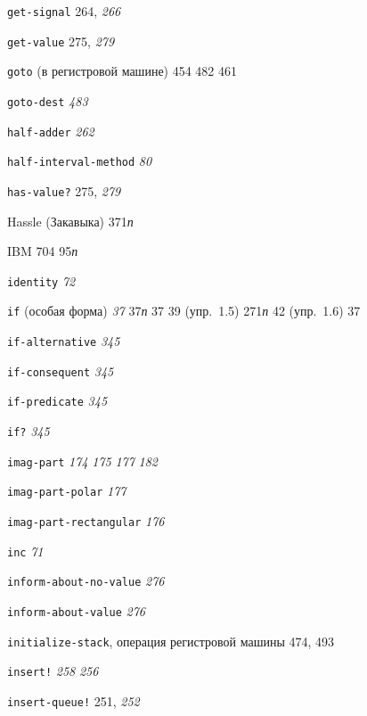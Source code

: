 \begin{theindex}
\item {\texttt{get-signal}} 264, {\it 266}
\item {\texttt{get-value}} 275, {\it 279}
\item {\texttt{goto} (в регистровой машине)} 454
   482
   461
\item {\texttt{goto-dest}} {\it 483}
\bigskip
\item {\texttt{half-adder}} {\it 262}
\item {\texttt{half-interval-method}} {\it 80}
\item {\texttt{has-value?}} 275, {\it 279}
\item {Hassle (Закавыка)} 371{\it п}
\bigskip
\item {IBM 704} 95{\it п}
\item {\texttt{identity}} {\it 72}
\item {\texttt{if} (особая форма)} {\it 37}
   37{\it п}
   37
   39 (упр.~1.5)
   271{\it п}
   42 (упр.~1.6)
   37
\item {\texttt{if-alternative}} {\it 345}
\item {\texttt{if-consequent}} {\it 345}
\item {\texttt{if-predicate}} {\it 345}
\item {\texttt{if?}} {\it 345}
\item {\texttt{imag-part}}
   {\it 174}
   {\it 175}
   {\it 177}
   {\it 182}
\item {\texttt{imag-part-polar}} {\it 177}
\item {\texttt{imag-part-rectangular}} {\it 176}
\item {\texttt{inc}} {\it 71}
\item {\texttt{inform-about-no-value}} {\it 276}
\item {\texttt{inform-about-value}} {\it 276}
\item {\texttt{initialize-stack}, операция регистровой машины} 474, 493
\item {\texttt{insert!}}
   {\it 258}
   {\it 256}
\item {\texttt{insert-queue!}} 251, {\it 252}

\end{theindex}
